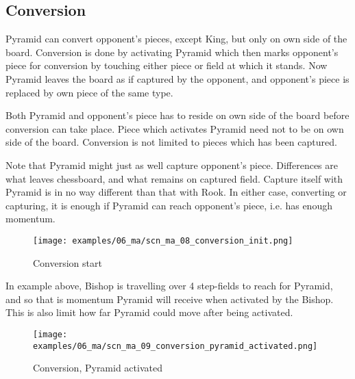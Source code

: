 \clearpage %

\subsection*{Conversion}
\label{sec:Mayan Ascendancy/Pyramid/Conversion}

Pyramid can convert opponent's pieces, except King, but only on own side of
the board. Conversion is done by activating Pyramid which then marks opponent's
piece for conversion by touching either piece or field at which it stands. Now
Pyramid leaves the board as if captured by the opponent, and opponent's piece
is replaced by own piece of the same type.

Both Pyramid and opponent's piece has to reside on own side of the board before
conversion can take place. Piece which activates Pyramid need not to be on own
side of the board. Conversion is not limited to pieces which has been captured.

Note that Pyramid might just as well capture opponent's piece. Differences are
what leaves chessboard, and what remains on captured field. Capture itself with
Pyramid is in no way different than that with Rook. In either case, converting
or capturing, it is enough if Pyramid can reach opponent's piece, i.e. has
enough momentum.

\clearpage %

\noindent
\begin{figure}[!h]
\texttt{[image: examples/06\_ma/scn\_ma\_08\_conversion\_init.png]}
\caption{Conversion start}
\label{fig:scn_ma_08_conversion_init}
\end{figure}

In example above, Bishop is travelling over 4 step-fields to reach for Pyramid,
and so that is momentum Pyramid will receive when activated by the Bishop.
This is also limit how far Pyramid could move after being activated.

\clearpage %

\noindent
\begin{figure}[!h]
\texttt{[image: examples/06\_ma/scn\_ma\_09\_conversion\_pyramid\_activated.png]}
\caption{Conversion, Pyramid activated}
\label{fig:scn_ma_09_conversion_pyramid_activated}
\end{figure}

